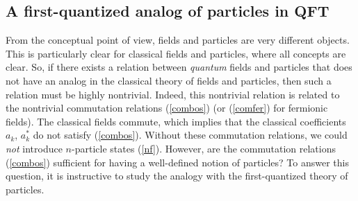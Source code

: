 \documentclass[12pt]{article}
\begin{document}
\subsection{A first-quantized analog of particles in QFT}

From the conceptual point of view, fields and particles are very 
different objects. This is particularly clear for classical 
fields and particles, where all concepts are clear. So, if there exists 
a relation between {\em quantum} fields and particles that does not 
have an analog in the classical theory of fields and particles, 
then such a relation must be highly nontrivial. Indeed, this 
nontrivial relation is related to the nontrivial commutation relations
(\ref{combos}) (or (\ref{comfer}) for fermionic fields). 
The classical fields commute, which implies that 
the classical coefficients $a_k$, $a_k^*$ do not satisfy (\ref{combos}).
Without these commutation relations, we could {\em not}
introduce $n$-particle states (\ref{nf}). 
However, are the commutation relations (\ref{combos}) sufficient 
for having a well-defined notion of particles? To answer this 
question, it is instructive to study the analogy with 
the first-quantized theory of particles. 
\end{document}

